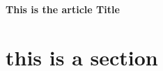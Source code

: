 \documentclass[12pt]{article}
\theoremstyle{mythm}
\begin{document}
\begin{center}
\Large{\bf  This is the article Title}	
\end{center}
\pagebreak
\section{this is a section}
\newpage
\end{document}
